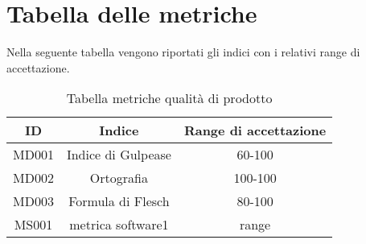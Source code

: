 \section{Tabella delle metriche}
Nella seguente tabella vengono riportati gli indici con i relativi range di accettazione.\\
\begin{table}[h]
    \begin{center}
      \begin{tabular}{|c|c|c|}
        \hline
        \textbf{ID} & \textbf{Indice}       & \textbf{Range di accettazione}\\
        \hline
        MD001       & Indice di Gulpease    & 60-100\\
        MD002       & Ortografia            & 100-100\\
        MD003       & Formula di Flesch     & 80-100\\\hline
        MS001       & metrica software1     & range\\
            
        \hline
      \end{tabular}
      \caption{Tabella metriche qualità di prodotto}
    \end{center}
\end{table}